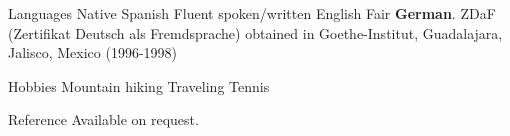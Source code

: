 \documentclass{resume}
\begin{document}
\begin{category}{Languages}
\citembullet Native Spanish
\citembullet Fluent spoken/written English
\citembullet Fair \textbf{German}. ZDaF (Zertifikat Deutsch als Fremdsprache) obtained in Goethe-Institut, Guadalajara, Jalisco, Mexico (1996-1998)
\end{category}

\begin{category}{Hobbies}
\citembullet Mountain hiking
\citembullet Traveling
\citembullet Tennis
\end{category}

\begin{category}{Reference} 
\citemnobullet Available on request.
\end{category}
\end{document}

